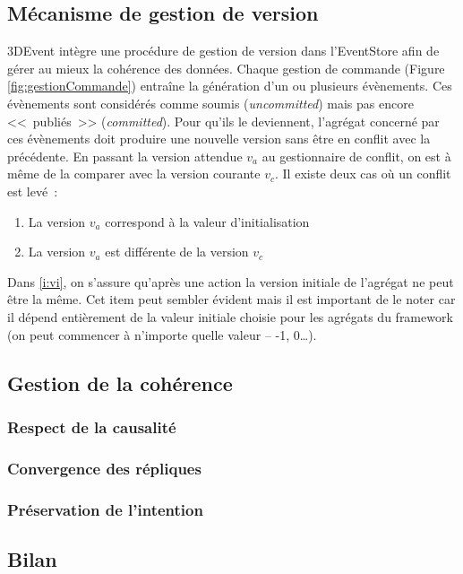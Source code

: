 \subsection{Mécanisme de gestion de version}
3DEvent intègre une procédure de gestion de version dans l'\gls{EventStore} afin 
de gérer au mieux la cohérence des données. 
Chaque gestion de commande (Figure \ref{fig:gestionCommande}) entraîne la 
génération d'un ou plusieurs évènements. Ces évènements sont considérés 
comme \og soumis\fg{} (\textit{uncommitted}) mais pas encore <<~publiés~>> 
(\textit{committed}).  Pour qu'ils le deviennent, l'agrégat concerné par ces 
évènements doit produire une nouvelle version sans être en conflit avec la 
précédente. En passant la version attendue $v_a$ au gestionnaire de conflit, on 
est à même de la comparer avec la version courante $v_c$. Il existe deux cas où 
un conflit est levé~: 
\begin{enumerate}[label=\alph*)]
	\item \label{i:vi} La version $v_a$ correspond à la valeur d'initialisation
	\item \label{i:vdiff} La version $v_a$ est différente de la version $v_c$
\end{enumerate}
Dans \ref{i:vi}, on s'assure qu'après une action la version initiale de l'agrégat ne 
peut être la même. Cet item peut sembler évident mais il est important de le noter 
car il dépend entièrement de la valeur initiale choisie pour les agrégats du 
\gls{framework} (on peut commencer à n'importe quelle valeur -- -1, 0\ldots).



\subsection{Gestion de la cohérence}


\subsubsection{Respect de la causalité}
\subsubsection{Convergence des répliques}
\subsubsection{Préservation de l'intention}
\subsection{Bilan}
